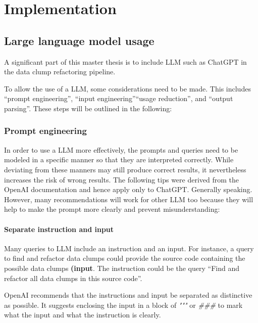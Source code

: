 
\begingroup
\renewcommand{\cleardoublepage}{} %
\renewcommand{\clearpage}{}
\chapter{Implementation}\label{chapter:implementation}
\endgroup

\section{Large language model usage}
A significant part of this master thesis is to include \ac{LLM} such as ChatGPT in the data clump refactoring pipeline. 

To allow the use of a \ac{LLM}, some considerations need to be made. This includes \enquote{prompt engineering}, \enquote{input engineering}\enquote{usage reduction}, and   \enquote{output parsing}. These steps will be outlined in the following:

\subsection{Prompt engineering}\label{sec:prompt_engineering}


In order to use a \ac{LLM} more effectively, the prompts and queries need to be modeled in a specific manner so that they are interpreted correctly. While deviating from these manners may still produce correct results, it nevertheless increases the risk of wrong results. The following tips were derived from the OpenAI documentation \cite{ChatGPT_url} and hence apply only to ChatGPT. Generally speaking. However, many recommendations will work for other \ac{LLM} too because they will help to make the prompt more clearly and prevent misunderstanding:

\subsubsection{Separate instruction and input}
Many queries to \ac{LLM} include an instruction and an input. For instance, a query to find and refactor data clumps could  provide the source code containing the possible data clumps \textbf{(input}. The instruction could be the query \enquote{Find and refactor all data clumps in this source code}. 

OpenAI recommends that the instructions and input be separated as distinctive as possible. It suggests enclosing the input in a block of \textit{"""} or \textit{\#\#\#} to mark what the input and what the instruction is clearly.


